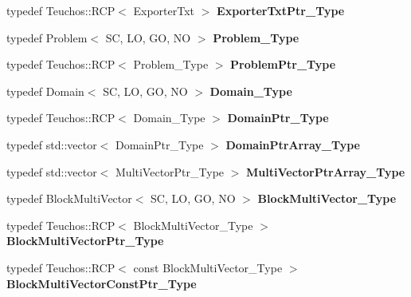 \begin{DoxyCompactItemize}
\item 
\mbox{\label{classFEDD_1_1AdaptiveMeshRefinement_a2ea29617a7415329e9b410f9243714fc}} 
typedef Teuchos\+::\+R\+CP$<$ Exporter\+Txt $>$ {\bfseries Exporter\+Txt\+Ptr\+\_\+\+Type}
\item 
\mbox{\label{classFEDD_1_1AdaptiveMeshRefinement_a4ee2f7c049cf9cf895bdb06b7a561d91}} 
typedef Problem$<$ SC, LO, GO, NO $>$ {\bfseries Problem\+\_\+\+Type}
\item 
\mbox{\label{classFEDD_1_1AdaptiveMeshRefinement_a516137f79f1c9ea2675e015c01f9b375}} 
typedef Teuchos\+::\+R\+CP$<$ Problem\+\_\+\+Type $>$ {\bfseries Problem\+Ptr\+\_\+\+Type}
\item 
\mbox{\label{classFEDD_1_1AdaptiveMeshRefinement_ad711f7d9830636eace6c103e6c689f5b}} 
typedef Domain$<$ SC, LO, GO, NO $>$ {\bfseries Domain\+\_\+\+Type}
\item 
\mbox{\label{classFEDD_1_1AdaptiveMeshRefinement_a26fe510a0281fd8f837110cf471410c0}} 
typedef Teuchos\+::\+R\+CP$<$ Domain\+\_\+\+Type $>$ {\bfseries Domain\+Ptr\+\_\+\+Type}
\item 
\mbox{\label{classFEDD_1_1AdaptiveMeshRefinement_aebc0627ef139b217812c8f471145dae3}} 
typedef std\+::vector$<$ Domain\+Ptr\+\_\+\+Type $>$ {\bfseries Domain\+Ptr\+Array\+\_\+\+Type}
\item 
\mbox{\label{classFEDD_1_1AdaptiveMeshRefinement_a8979f9f92c0664bbc0789403106ed59b}} 
typedef std\+::vector$<$ Multi\+Vector\+Ptr\+\_\+\+Type $>$ {\bfseries Multi\+Vector\+Ptr\+Array\+\_\+\+Type}
\item 
\mbox{\label{classFEDD_1_1AdaptiveMeshRefinement_a2e1b21d4d97f898a4f6b06f5a889c249}} 
typedef Block\+Multi\+Vector$<$ SC, LO, GO, NO $>$ {\bfseries Block\+Multi\+Vector\+\_\+\+Type}
\item 
\mbox{\label{classFEDD_1_1AdaptiveMeshRefinement_aa78abbd0cc3c375c1b4482971e28cdea}} 
typedef Teuchos\+::\+R\+CP$<$ Block\+Multi\+Vector\+\_\+\+Type $>$ {\bfseries Block\+Multi\+Vector\+Ptr\+\_\+\+Type}
\item 
\mbox{\label{classFEDD_1_1AdaptiveMeshRefinement_a906e91e900ed67e5559e4d40053b443f}} 
typedef Teuchos\+::\+R\+CP$<$ const Block\+Multi\+Vector\+\_\+\+Type $>$ {\bfseries Block\+Multi\+Vector\+Const\+Ptr\+\_\+\+Type}
\end{DoxyCompactItemize}
